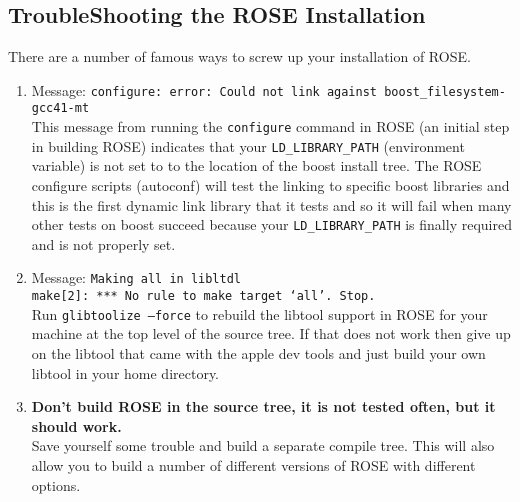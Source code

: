 \subsection{TroubleShooting the ROSE Installation}


   There are a number of famous ways to screw up your installation of ROSE.
\begin{enumerate}
   \item Message: {\tt configure: error: Could not link against boost\_filesystem-gcc41-mt} \\
   This message from running the {\tt configure} command in ROSE (an initial step in building
   ROSE) indicates that your {\tt LD\_LIBRARY\_PATH} (environment variable) is not set to 
   to the location of the boost install tree.  The ROSE configure scripts (autoconf) will
   test the linking to specific boost libraries and this is the first dynamic link library 
   that it tests and so it will fail when many other tests on boost succeed because your
   {\tt LD\_LIBRARY\_PATH} is finally required and is not properly set.

   \item Message: {\tt Making all in libltdl \\
      make[2]: *** No rule to make target `all'.  Stop.} \\
   Run {\tt glibtoolize --force} to rebuild the libtool support in ROSE for your machine 
   at the top level of the source tree. If that does not work then give up on the libtool 
   that came with the apple dev tools and just build your own libtool in your home directory.

   \item {\bf Don't build ROSE in the source tree, it is not tested often, but it should work.} \\
    Save yourself some trouble and build a separate compile tree.  This will also allow
    you to build a number of different versions of ROSE with different options.


\end{enumerate}

